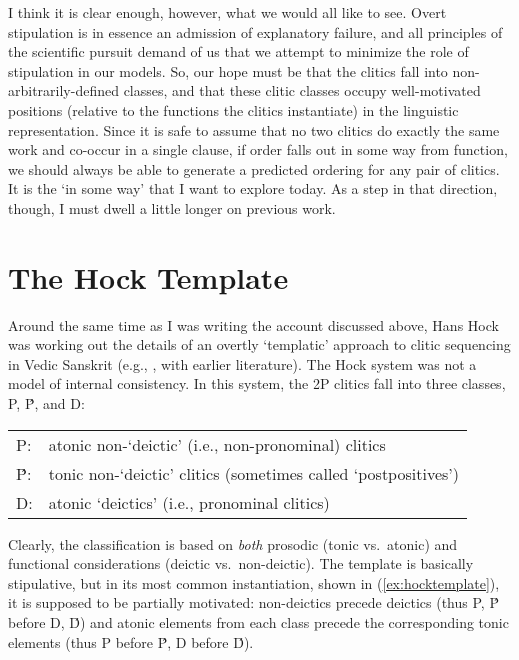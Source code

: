 \documentclass[output=paper,
modfonts
]{LSP/langsci}
\begin{document}
I think it is clear enough, however, what we would all like to see. Overt stipulation
is in essence an admission of explanatory failure, and all principles of the scientific pursuit
demand of us that we attempt to minimize the role of stipulation in our models. So, our hope must be that the clitics 
fall into non-arbitrarily-defined classes, and that these clitic classes occupy 
well-motivated positions (relative to the functions the clitics instantiate) in the linguistic representation.
Since it is safe to assume that no two clitics do exactly the same work and co-occur in
a single clause, if order falls out in some way from function, we should always be able to generate
a predicted ordering for any pair of clitics. It is the `in some way' that I want
to explore today. As a step in that direction, though, I must dwell a little longer on previous work.%

\section{The Hock Template}

Around the same time as I was writing the account discussed above, Hans Hock was
working out the details of an overtly `templatic' approach to clitic sequencing in Vedic Sanskrit (e.g.,
\citealt{hock1996}, with earlier literature). 
The Hock system was not a model of internal consistency. In this system, the 2P clitics fall into three
classes, P, \'{P}, and {D}: 

\begin{exe}
\ex \begin{tabular}[t]{ll}
P: &  atonic non-`deictic' (i.e., non-pronominal) clitics\\
\'{P}: & tonic non-`deictic' clitics (sometimes called `postpositives')\\
D: & atonic `deictics' (i.e., pronominal clitics)\\
\end{tabular}
\end{exe}

\noindent Clearly, the classification is based on \textit{both} prosodic (tonic vs.\ atonic) and functional considerations
(deictic vs.\ non-deictic). The template is basically stipulative, but in its most common instantiation, shown in (\ref{ex:hocktemplate}), it is supposed to be 
partially motivated: non-deictics precede deictics (thus P, \'{P} before D, \'{D})
and atonic elements from
each class precede the corresponding tonic elements (thus P before \'{P}, D before \'{D}).
\end{document}
